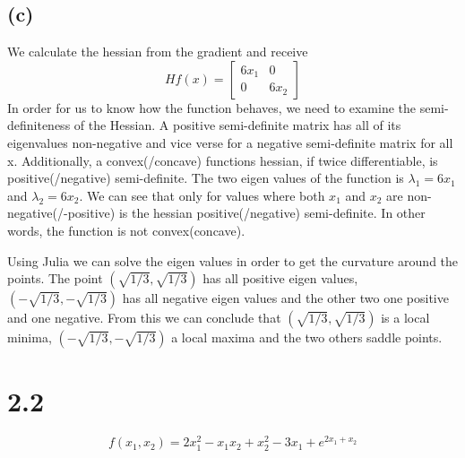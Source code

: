 \documentclass{article}
\begin{document}
\subsection*{(c)}
	We calculate the hessian from the gradient and receive 
	\begin{equation}
		Hf(x) = \begin{bmatrix}
			6x_1 & 0 \\
			0 & 6x_2
		\end{bmatrix} 
	\end{equation}
	In order for us to know how the function behaves, we need to examine the semi-definiteness of the Hessian. A positive semi-definite matrix has all of its eigenvalues non-negative and vice verse for a negative semi-definite matrix for all x. Additionally, a convex(/concave) functions hessian, if twice differentiable, is positive(/negative) semi-definite. The two eigen values of the function is $\lambda_1 = 6x_1$ and $\lambda_2 = 6x_2$. We can see that only for values where both $x_1$ and $x_2$ are non-negative(/-positive) is the hessian positive(/negative) semi-definite. In other words, the function is not convex(concave). 
	
	Using Julia we can solve the eigen values in order to get the curvature around the points. The point $(\sqrt{1/3},\sqrt{1/3})$ has all positive eigen values, $(-\sqrt{1/3},-\sqrt{1/3})$ has all negative eigen values and the other two one positive and one negative. From this we can conclude that $(\sqrt{1/3},\sqrt{1/3})$ is a local minima, $(-\sqrt{1/3},-\sqrt{1/3})$ a local maxima and the two others saddle points. 
\section*{2.2}
	\begin{equation}
		f(x_1,x_2) = 2x^2_1 -x_1x_2+x_2^2 -3x_1 + e^{2x_1+x_2}
	\end{equation}
\end{document}

